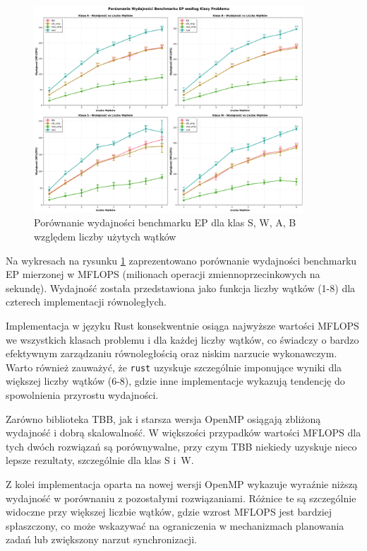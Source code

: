\begin{figure}[H]
    \centering
    \includegraphics[width=0.9\textwidth]{analiza/images/parallel/ep/arm/ep_porownanie_wydajnosci.png}
    \caption{Porównanie wydajności benchmarku EP dla klas S, W, A, B względem liczby użytych wątków}
    \label{ep_porownanie_wydajnosci}
\end{figure}
Na wykresach na rysunku \ref{ep_porownanie_wydajnosci} zaprezentowano porównanie wydajności benchmarku EP mierzonej w MFLOPS (milionach operacji zmiennoprzecinkowych na sekundę). Wydajność została przedstawiona jako funkcja liczby wątków (1-8) dla czterech implementacji równoległych.

Implementacja w języku Rust konsekwentnie osiąga najwyższe wartości MFLOPS we wszystkich klasach problemu i dla każdej liczby wątków, co świadczy o bardzo efektywnym zarządzaniu równoległością oraz niskim narzucie wykonawczym. Warto również zauważyć, że \texttt{rust} uzyskuje szczególnie imponujące wyniki dla większej liczby wątków (6-8), gdzie inne implementacje wykazują tendencję do spowolnienia przyrostu wydajności.

Zarówno biblioteka TBB, jak i starsza wersja OpenMP osiągają zbliżoną wydajność i dobrą skalowalność. W większości przypadków wartości MFLOPS dla tych dwóch rozwiązań są porównywalne, przy czym TBB niekiedy uzyskuje nieco lepsze rezultaty, szczególnie dla klas S i~W.

Z kolei implementacja oparta na nowej wersji OpenMP wykazuje wyraźnie niższą wydajność w porównaniu z pozostałymi rozwiązaniami. Różnice te są szczególnie widoczne przy większej liczbie wątków, gdzie wzrost MFLOPS jest bardziej spłaszczony, co może wskazywać na ograniczenia w mechanizmach planowania zadań lub zwiększony narzut synchronizacji.


